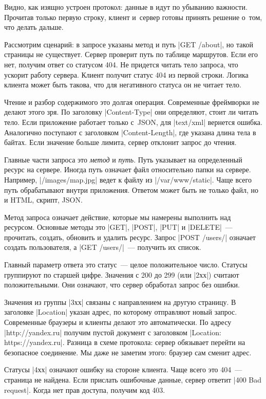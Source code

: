 Видно, как изящно устроен протокол: данные в идут по убыванию важности.
Прочитав только первую строку, клиент и~сервер готовы принять решение о~том, что
делать дальше.

Рассмотрим сценарий: в запросе указаны метод и путь \spverb|GET /about|, но
такой страницы не существует. Сервер проверит путь по таблице маршрутов. Если
его нет, получим ответ со статусом 404. Не придется читать тело запроса, что
ускорит работу сервера. Клиент получит статус 404 из первой строки. Логика
клиента может быть такова, что для негативного статуса он не читает тело.

Чтение и разбор содержимого это долгая операция. Современные фреймворки не
делают этого зря. По заголовку \spverb|Content-Type| они определяют, стоит ли
читать тело. Если приложение работает только с~JSON, для \spverb|text/xml|
вернется ошибка. Аналогично поступают с заголовком \spverb|Content-Length|, где
указана длина тела в байтах. Если значение больше лимита, сервер отклонит запрос
до чтения.

Главные части запроса это \emph{метод} и \emph{путь}. Путь указывает на
определенный ресурс на сервере. Иногда путь означает файл относительно папки на
сервере. Например, \spverb|/images/map.jpg| ведет к файлу из
\spverb|/var/www/static|. Чаще всего путь обрабатывают внутри приложения.
Ответом может быть не только файл, но и HTML, скрипт, JSON.

Метод запроса означает действие, которые мы намерены выполнить над
ресурсом. Основные методы это \spverb|GET|, \spverb|POST|, \spverb|PUT| и
\spverb|DELETE|~--- прочитать, создать, обновить и удалить ресурс. Запрос
\spverb|POST /users/| означает создать пользователя, а \spverb|GET /users/|~---
получить их список.

Главный параметр ответа это статус~--- целое положительное число. Статусы
группируют по старшей цифре. Значения с 200 до 299 (или \spverb|2хх|) считают
положительными. Они означают, что сервер обработал запрос без ошибки.

Значения из группы \spverb|3хх| связаны с направлением на другую страницу. В
заголовке \spverb|Location| указан адрес, по которому отправляют новый
запрос. Современные браузеры и клиенты делают это автоматически. По адресу
\spverb|http://yandex.ru| получим пустой документ с заголовком
\spverb|Location: https://yandex.ru|. Разница в схеме протокола: сервер обязывает
перейти на безопасное соединение. Мы даже не заметим этого: браузер сам сменит адрес.

Статусы \spverb|4хх| означают ошибку на стороне клиента. Чаще всего это 404~---
страница не найдена. Если прислать ошибочные данные, сервер ответит
\spverb|400 Bad request|. Когда нет прав доступа, получим код 403.

